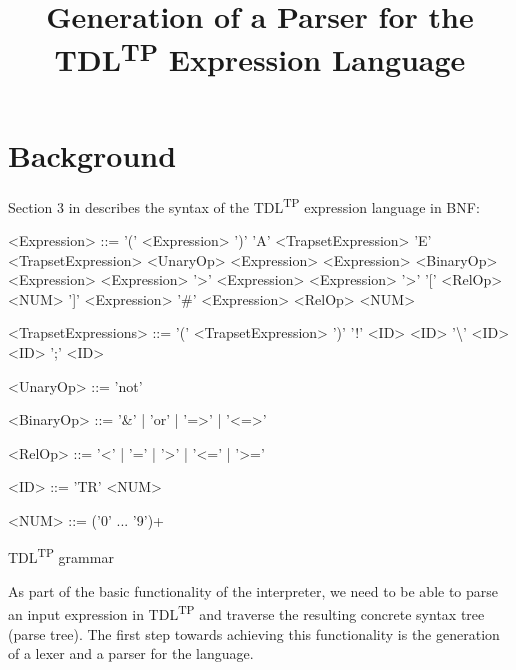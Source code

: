 \documentclass[12pt,oneside,a4paper,notitlepage]{report}
\title{
	Generation of a Parser for the TDL\textsuperscript{TP} Expression Language
}
\newcommand{\texttilde}{\raisebox{0.5ex}{\texttildelow}}
\begin{document}
	\maketitle

	\section*{Background}
	\par Section 3 in \cite{tdlarticle} describes the syntax of the TDL\textsuperscript{TP} expression language in BNF:

	\begin{GrammarWrapper}
		\begin{grammar}
		<Expression>	::=	'(' <Expression> ')'
		\alt 				'A' <TrapsetExpression>
		\alt 				'E' <TrapsetExpression>
		\alt 				<UnaryOp> <Expression>
		\alt 				<Expression> <BinaryOp> <Expression>
		\alt 				<Expression> '\texttilde\textgreater' <Expression>
		\alt 				<Expression> '\texttilde\textgreater' '[' <RelOp> <NUM> ']' <Expression>
		\alt 				'\#' <Expression> <RelOp> <NUM>
		
		<TrapsetExpressions>	::=	'(' <TrapsetExpression> ')'
		\alt						'!' <ID>
		\alt 						<ID> '\textbackslash' <ID>
		\alt						<ID> ';' <ID>
		
		<UnaryOp>	::= 'not'
		
		<BinaryOp>	::= '\&' | 'or' | '=\textgreater' | '\textless=\textgreater'
		
		<RelOp> 	::= '\textless' | '=' | '\textgreater' | '\textless=' | '\textgreater='
		
		<ID> 		::= 'TR' <NUM>
		
		<NUM> 		::= ('0' ... '9')+
		\end{grammar}
		\caption{TDL\textsuperscript{TP} grammar}\label{bnf:original}
	\end{GrammarWrapper}

	As part of the basic functionality of the interpreter, we need to be able to parse an input expression in TDL\textsuperscript{TP} and traverse the resulting concrete syntax tree (parse tree). The first step towards achieving this functionality is the generation of a lexer and a parser for the language. 
\end{document}
